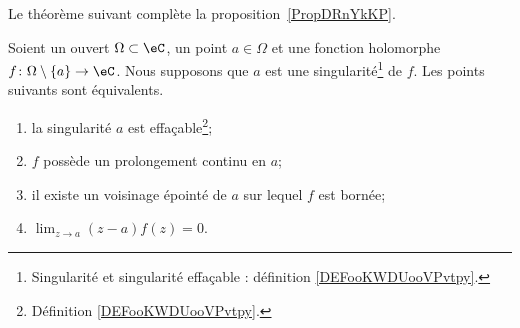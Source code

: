 Le théorème suivant complète la proposition~\ref{PropDRnYkKP}.
\begin{theorem}    \label{ThoTLQOEwW}
	Soient un ouvert \( \Omega\subset \eC\), un point \( a\in \Omega \) et une fonction holomorphe \( f\colon \Omega\setminus\{ a \}\to \eC\). Nous supposons que \( a\) est une singularité\footnote{Singularité et singularité effaçable : définition \ref{DEFooKWDUooVPvtpy}.} de \( f\). Les points suivants sont équivalents.
	\begin{enumerate}
		\item       \label{ITEMooMLXJooMfuifN}
		      la singularité \( a\) est effaçable\footnote{Définition \ref{DEFooKWDUooVPvtpy}.};
		\item       \label{ITEMooBWPEooEltHAa}
		      \( f\) possède un prolongement continu en \( a\);
		\item       \label{ITEMooEAUOooIWcxHS}
		      il existe un voisinage épointé de \( a\) sur lequel \( f\) est bornée;
		\item       \label{ITEMooETRWooDTTpxs}
		      \( \lim_{z\to a}(z-a)f(z)=0\).
	\end{enumerate}
\end{theorem}

